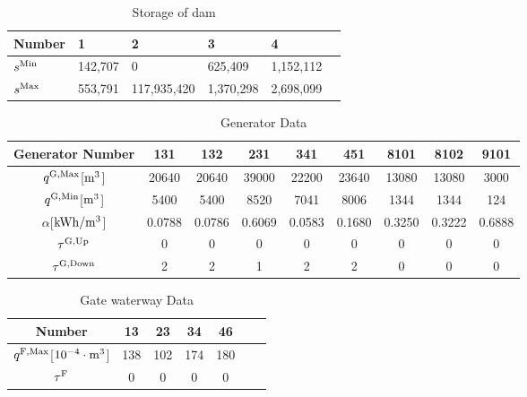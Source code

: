 \begin{table}[htbp]
\begin{center}
\caption{Storage of dam}
\label{storage}
\begin{tabular}{llllll}
\hline
Number & 1 & 2 & 3 & 4\\
\hline \hline
$s^{\rm Min}$ & 142,707 & 0 & 625,409 & 1,152,112 & \\
$s^{\rm Max}$ & 553,791 & 117,935,420 & 1,370,298 & 2,698,099\\
\hline
\end{tabular}
\label{storage}
\end{center}
\end{table}

\begin{table}[htbp]
\label{table:7}
\begin{center}
\caption{Generator Data}
\vspace*{-5mm}
\begin{tabular}{ccccccccc}
\hline
Generator Number & 131 & 132 & 231 & 341 & 451 & 8101 & 8102 & 9101 \\ \hline \hline
$q^{\rm G,Max}$[$\rm{m^3}$] & 20640 & 20640 & 39000 & 22200 & 23640 & 13080 & 13080 & 3000 \\
$q^{\rm G,Min}$[$\rm{m^3}$] & 5400 & 5400 & 8520 & 7041 & 8006 & 1344 & 1344 & 124\\
$\alpha$[$\rm{kWh/m^3}$] & 0.0788 & 0.0786 & 0.6069 & 0.0583 & 0.1680 & 0.3250 & 0.3222 & 0.6888\\
$\tau^{\rm G,Up}$ & 0 & 0 & 0 & 0 & 0 & 0 & 0  & 0 \\
$\tau^{\rm G,Down}$ & 2 & 2 & 1 & 2 & 2 & 0 & 0  & 0 \\
\hline
\end{tabular}
\end{center}
\end{table}

\begin{table}[htbp]
\begin{center}
\caption{Gate waterway Data}
\label{gate}
\begin{tabular}{ccccccc}
\hline
Number &13 & 23 & 34 & 46 \\ \hline \hline
$q^{\rm F,Max}$[$\rm {10^{-4} \cdot m^3}$] & 138 & 102 & 174 & 180 \\
$\tau^{\rm F}$ & 0 & 0 & 0 & 0 \\
\hline
\end{tabular}
\end{center}
\end{table}

